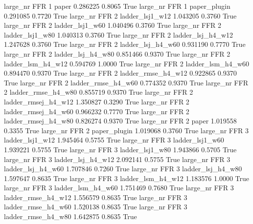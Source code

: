   large_nr      FFR                 1               paper    0.286225      0.8065    True
  large_nr      FFR                 1        paper_plugin    0.291085      0.7720    True
  large_nr      FFR                 2     ladder_lsj1_w12    1.043205      0.3760    True
  large_nr      FFR                 2     ladder_lsj1_w60    1.040496      0.3760    True
  large_nr      FFR                 2     ladder_lsj1_w80    1.040313      0.3760    True
  large_nr      FFR                 2   ladder_lsj_h4_w12    1.247628      0.3760    True
  large_nr      FFR                 2   ladder_lsj_h4_w60    0.931190      0.7770    True
  large_nr      FFR                 2   ladder_lsj_h4_w80    0.851466      0.9370    True
  large_nr      FFR                 2   ladder_lsm_h4_w12    0.594769      1.0000    True
  large_nr      FFR                 2   ladder_lsm_h4_w60    0.894470      0.9370    True
  large_nr      FFR                 2  ladder_rmse_h4_w12    0.922865      0.9370    True
  large_nr      FFR                 2  ladder_rmse_h4_w60    0.774352      0.9370    True
  large_nr      FFR                 2  ladder_rmse_h4_w80    0.855719      0.9370    True
  large_nr      FFR                 2 ladder_rmsej_h4_w12    1.350827      0.3290    True
  large_nr      FFR                 2 ladder_rmsej_h4_w60    0.966232      0.7770    True
  large_nr      FFR                 2 ladder_rmsej_h4_w80    0.826274      0.9370    True
  large_nr      FFR                 2               paper    1.019558      0.3355    True
  large_nr      FFR                 2        paper_plugin    1.019068      0.3760    True
  large_nr      FFR                 3     ladder_lsj1_w12    1.945464      0.5755    True
  large_nr      FFR                 3     ladder_lsj1_w60    1.939221      0.5755    True
  large_nr      FFR                 3     ladder_lsj1_w80    1.943866      0.5705    True
  large_nr      FFR                 3   ladder_lsj_h4_w12    2.092141      0.5755    True
  large_nr      FFR                 3   ladder_lsj_h4_w60    1.707846      0.7260    True
  large_nr      FFR                 3   ladder_lsj_h4_w80    1.597647      0.8635    True
  large_nr      FFR                 3   ladder_lsm_h4_w12    1.183576      1.0000    True
  large_nr      FFR                 3   ladder_lsm_h4_w60    1.751469      0.7680    True
  large_nr      FFR                 3  ladder_rmse_h4_w12    1.556579      0.8635    True
  large_nr      FFR                 3  ladder_rmse_h4_w60    1.520138      0.8635    True
  large_nr      FFR                 3  ladder_rmse_h4_w80    1.642875      0.8635    True

